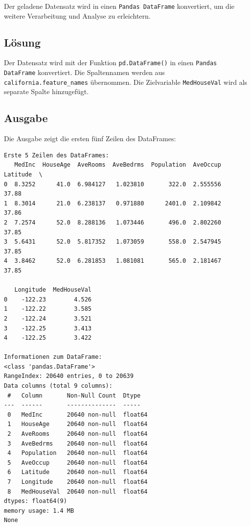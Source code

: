 Der geladene Datensatz wird in einen \texttt{Pandas DataFrame} konvertiert, um die weitere Verarbeitung und Analyse zu erleichtern.

\subsection{Lösung}

Der Datensatz wird mit der Funktion \texttt{pd.DataFrame()} in einen \texttt{Pandas DataFrame} konvertiert. Die Spaltennamen werden aus \texttt{california.feature\_names} übernommen. Die Zielvariable \texttt{MedHouseVal} wird als separate Spalte hinzugefügt.



\subsection{Ausgabe}

Die Ausgabe zeigt die ersten fünf Zeilen des DataFrames:

\begin{verbatim}
Erste 5 Zeilen des DataFrames:
   MedInc  HouseAge  AveRooms  AveBedrms  Population  AveOccup  Latitude  \
0  8.3252      41.0  6.984127   1.023810       322.0  2.555556     37.88   
1  8.3014      21.0  6.238137   0.971880      2401.0  2.109842     37.86   
2  7.2574      52.0  8.288136   1.073446       496.0  2.802260     37.85   
3  5.6431      52.0  5.817352   1.073059       558.0  2.547945     37.85   
4  3.8462      52.0  6.281853   1.081081       565.0  2.181467     37.85   

   Longitude  MedHouseVal  
0    -122.23        4.526  
1    -122.22        3.585  
2    -122.24        3.521  
3    -122.25        3.413  
4    -122.25        3.422  

Informationen zum DataFrame:
<class 'pandas.DataFrame'>
RangeIndex: 20640 entries, 0 to 20639
Data columns (total 9 columns):
 #   Column       Non-Null Count  Dtype  
---  ------       --------------  -----  
 0   MedInc       20640 non-null  float64
 1   HouseAge     20640 non-null  float64
 2   AveRooms     20640 non-null  float64
 3   AveBedrms    20640 non-null  float64
 4   Population   20640 non-null  float64
 5   AveOccup     20640 non-null  float64
 6   Latitude     20640 non-null  float64
 7   Longitude    20640 non-null  float64
 8   MedHouseVal  20640 non-null  float64
dtypes: float64(9)
memory usage: 1.4 MB
None
\end{verbatim}

